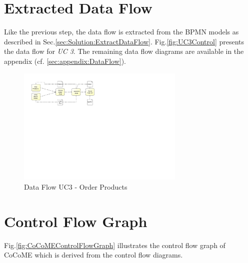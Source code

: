 \section{Extracted Data Flow}
\label{sec:SolutionApplication:ExtractControlFlow}
Like the previous step, the data flow is extracted from the BPMN models as described in Sec.\ref{sec:Solution:ExtractDataFlow}. Fig.\ref{fig:UC3Control} presents the data flow for \textit{UC 3}. The remaining data flow diagrams are available in the appendix (cf. \ref{sec:appendix:DataFlow}).

\begin{figure}[h!]
	\centering
	\includegraphics[width=8cm, trim={5cm 14cm 17cm 0cm}]{img/UC3DFD.pdf}
	\caption{Data Flow UC3 - Order Products}
	\label{fig:UC3DFD}
\end{figure}

\section{Control Flow Graph}
\label{sec:SolutionApplication:ControlFLowGraph}
Fig.\ref{fig:CoCoMEControlFlowGraph} illustrates the control flow graph of CoCoME which is derived from the control flow diagrams. 

